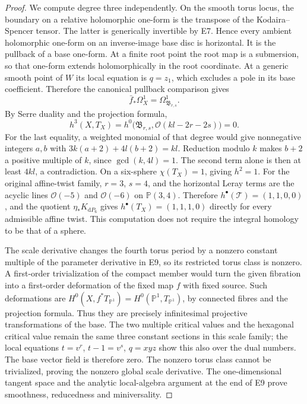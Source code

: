 \begin{proof}
We compute degree three independently. On the smooth torus locus,
the boundary on a relative holomorphic one-form is the transpose
of the Kodaira--Spencer tensor. The latter is generically invertible
by E7. Hence every ambient holomorphic one-form on an inverse-image
base disc is horizontal. It is the pullback of a base one-form.
At a finite root point the root map is a submersion, so that
one-form extends holomorphically in the root coordinate. At a
generic smooth point of $W$ its local equation is $q=z_1$, which
excludes a pole in its base coefficient. Therefore the canonical
pullback comparison gives
\[
 \bar f_*\Omega_X^1=\Omega_{\mathfrak B_{r,s}}^1.
\]
By Serre duality and the projection formula,
\[
 h^3(X,T_X)=h^0\bigl(\mathfrak B_{r,s},
                         \mathcal O(kl-2r-2s)\bigr)=0.
\]
For the last equality, a weighted monomial of that degree would
give nonnegative integers $a,b$ with
$3k(a+2)+4l(b+2)=kl$. Reduction modulo $k$ makes $b+2$ a positive
multiple of $k$, since $\gcd(k,4l)=1$. The second term alone
is then at least $4kl$, a contradiction. On a six-sphere
$\chi(T_X)=1$, giving $h^2=1$. For the original affine-twist
family, $r=3$, $s=4$, and the horizontal Leray terms are the
acyclic lines $\mathcal O(-5)$ and $\mathcal O(-6)$ on
$\mathbb P(3,4)$. Therefore $h^\bullet(\mathcal T)=(1,1,0,0)$,
and the quotient $\eta_*K_{\mathrm dP_6}$ gives
$h^\bullet(T_X)=(1,1,1,0)$ directly for every admissible affine
twist. This computation does not require the integral homology
to be that of a sphere.

The scale derivative changes the fourth torus period by a nonzero
constant multiple of the parameter derivative in E9, so its
restricted torus class is nonzero. A first-order trivialization of
the compact member would turn the given fibration into a
first-order deformation of the fixed map $f$ with fixed source.
Such deformations are $H^0(X,f^*T_{\mathbb P^1})
=H^0(\mathbb P^1,T_{\mathbb P^1})$, by connected fibres and
the projection formula. Thus they are precisely infinitesimal
projective transformations of the base. The two multiple critical
values and the hexagonal critical value remain the same three
constant sections in this scale family; the local equations
$t=v^r$, $t-1=v^s$, $q=xyz$ show this also over the dual numbers.
The base vector field is therefore zero. The nonzero torus class
cannot be trivialized, proving the nonzero global scale derivative.
The one-dimensional tangent space and the analytic local-algebra
argument at the end of E9 prove smoothness, reducedness and
miniversality.
\end{proof}


